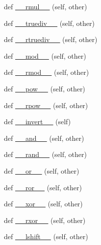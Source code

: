 \begin{DoxyCompactItemize}
\item 
def \hyperlink{classPIL_1_1ImageMath_1_1__Operand_acb6e1d239047790546a7e9aa8d3d61f8}{\+\_\+\+\_\+rmul\+\_\+\+\_\+} (self, other)
\item 
def \hyperlink{classPIL_1_1ImageMath_1_1__Operand_a3d4d7b39db8289fd453c80f4470851af}{\+\_\+\+\_\+truediv\+\_\+\+\_\+} (self, other)
\item 
def \hyperlink{classPIL_1_1ImageMath_1_1__Operand_aaa95a002df36560d667071d4e8fbb668}{\+\_\+\+\_\+rtruediv\+\_\+\+\_\+} (self, other)
\item 
def \hyperlink{classPIL_1_1ImageMath_1_1__Operand_a97eda4561937608995e3e604cf891619}{\+\_\+\+\_\+mod\+\_\+\+\_\+} (self, other)
\item 
def \hyperlink{classPIL_1_1ImageMath_1_1__Operand_a4946791e4e42eaeeeef21fc1731b2a31}{\+\_\+\+\_\+rmod\+\_\+\+\_\+} (self, other)
\item 
def \hyperlink{classPIL_1_1ImageMath_1_1__Operand_a914eae461c0c0a34907af44af2d23fef}{\+\_\+\+\_\+pow\+\_\+\+\_\+} (self, other)
\item 
def \hyperlink{classPIL_1_1ImageMath_1_1__Operand_a8eeef50044aadc8e9b565f40696f1013}{\+\_\+\+\_\+rpow\+\_\+\+\_\+} (self, other)
\item 
def \hyperlink{classPIL_1_1ImageMath_1_1__Operand_a61ba7c3cc4acd3a051f522beae95b96d}{\+\_\+\+\_\+invert\+\_\+\+\_\+} (self)
\item 
def \hyperlink{classPIL_1_1ImageMath_1_1__Operand_ada0dc4c13f68aace1ace3d31002031b7}{\+\_\+\+\_\+and\+\_\+\+\_\+} (self, other)
\item 
def \hyperlink{classPIL_1_1ImageMath_1_1__Operand_ae8e3bcdf4c1152ece02ee5b8c7b11a05}{\+\_\+\+\_\+rand\+\_\+\+\_\+} (self, other)
\item 
def \hyperlink{classPIL_1_1ImageMath_1_1__Operand_a2e4dd431b3dfc164a3806b762279990b}{\+\_\+\+\_\+or\+\_\+\+\_\+} (self, other)
\item 
def \hyperlink{classPIL_1_1ImageMath_1_1__Operand_afb4885cb627a4f6b59f5bf5c31739f16}{\+\_\+\+\_\+ror\+\_\+\+\_\+} (self, other)
\item 
def \hyperlink{classPIL_1_1ImageMath_1_1__Operand_ab7fbf1a8215f1ffc2eb80c43c0ae678a}{\+\_\+\+\_\+xor\+\_\+\+\_\+} (self, other)
\item 
def \hyperlink{classPIL_1_1ImageMath_1_1__Operand_a8b9294b51b61ac8ba1447adb1e430540}{\+\_\+\+\_\+rxor\+\_\+\+\_\+} (self, other)
\item 
def \hyperlink{classPIL_1_1ImageMath_1_1__Operand_aba6cab9289165ef29e00d000c698c749}{\+\_\+\+\_\+lshift\+\_\+\+\_\+} (self, other)

\end{DoxyCompactItemize}
